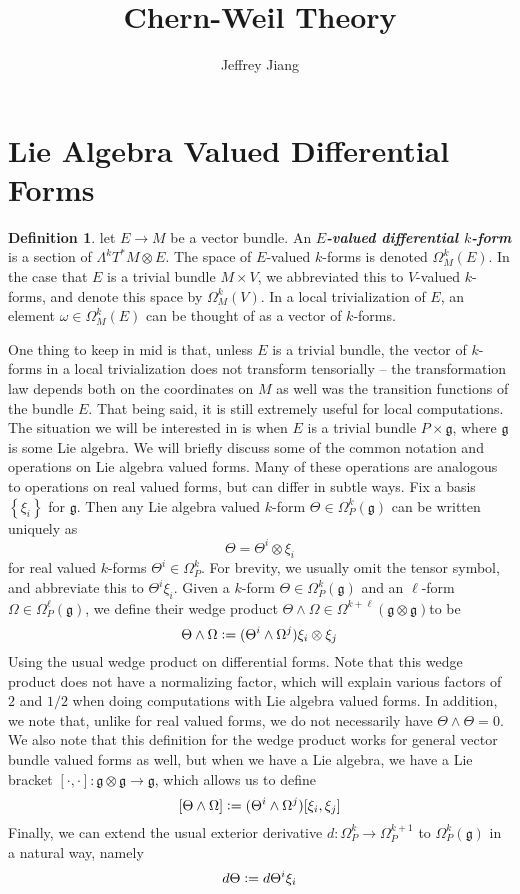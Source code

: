 \documentclass[psamsfonts, 12pt]{amsart}
\theoremstyle{definition}
\newtheorem{defn}[thm]{Definition}
\theoremstyle{remark}
\newcommand{\ib}[1]{\textbf{\textit{#1}}}
\newcommand{\g}{\mathfrak{g}}
\newcommand{\set}[1]{\left\lbrace #1 \right\rbrace}
\newcommand{\defeq}{\vcentcolon=}
\begin{document}
%
\author{Jeffrey Jiang}
%
\title{Chern-Weil Theory}
%
\maketitle
%
\tableofcontents
%
\section{Lie Algebra Valued Differential Forms}
%
\begin{defn}
let $E \to M$ be a vector bundle. An \ib{$E$-valued differential $k$-form} is
a section of $\Lambda^kT^*M \otimes E$. The space of $E$-valued $k$-forms is denoted
$\Omega^k_M(E)$. In the case that $E$ is a trivial bundle $M \times V$, we
abbreviated this to $V$-valued $k$-forms, and denote this space by $\Omega^k_M(V)$.
In a local trivialization of $E$, an element $\omega \in \Omega^k_M(E)$ can
be thought of as a vector of $k$-forms.
\end{defn}
%
One thing to keep in mid is that, unless $E$ is a trivial bundle, the
vector of $k$-forms in a local trivialization does not transform tensorially --
the transformation law depends both on the coordinates on $M$ as well was the
transition functions of the bundle $E$. That being said, it is still extremely
useful for local computations. \\

The situation we will be interested in is when $E$ is a trivial bundle $P \times \g$,
where $\g$ is some Lie algebra. We will briefly discuss some of the common notation
and operations on Lie algebra valued forms. Many of these operations are analogous to
operations on real valued forms, but can differ in subtle ways. Fix a basis $\set{\xi_i}$
for $\g$. Then any Lie algebra valued $k$-form $\Theta \in \Omega^k_P(\g)$ can be written
uniquely as
\[
\Theta = \Theta^i \otimes \xi_i
\]
for real valued $k$-forms $\Theta^i \in \Omega^k_P$. For brevity, we usually omit the
tensor symbol, and abbreviate this to $\Theta^i\xi_i$. Given a $k$-form
$\Theta \in \Omega^k_P(\g)$ and an $\ell$-form $\Omega \in \Omega^\ell_P(\g)$, we
define their wedge product $\Theta\wedge\Omega \in \Omega^{k+\ell}(\g\otimes\g)$to be
\[
\Theta \wedge \Omega \defeq (\Theta^i\wedge\Omega^j)\xi_i \otimes  \xi_j
\]
Using the usual wedge product on differential forms. Note that this wedge product
does not have a normalizing factor, which will explain various factors of $2$
and $1/2$ when doing computations with Lie algebra valued forms. In addition, we note
that, unlike for real valued forms, we do not necessarily have $\Theta\wedge\Theta = 0$.
We also note that this definition for the wedge product works for general vector bundle
valued forms as well, but when we have a Lie algebra, we have a Lie bracket
$[\cdot,\cdot]: \g \otimes \g \to \g$, which allows us to define
\[
[\Theta\wedge\Omega] \defeq (\Theta^i\wedge\Omega^j)[\xi_i,\xi_j]
\]
Finally, we can extend the usual exterior derivative $d : \Omega^k_P \to \Omega^{k+1}_P$
to $\Omega^k_P(\g)$ in a natural way, namely
\[
d\Theta \defeq d\Theta^i\xi_i
\]
%
\end{document}
